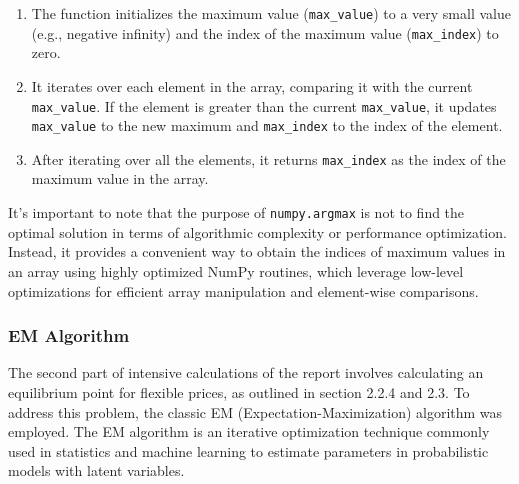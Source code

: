 \documentclass[a4paper,12pt]{article}
\begin{document}
\begin{enumerate}
	\item The function initializes the maximum value (\texttt{max\_value}) to a very small value (e.g., negative infinity) and the index of the maximum value (\texttt{max\_index}) to zero.
	\item It iterates over each element in the array, comparing it with the current \texttt{max\_value}. If the element is greater than the current \texttt{max\_value}, it updates \texttt{max\_value} to the new maximum and \texttt{max\_index} to the index of the element.
	\item After iterating over all the elements, it returns \texttt{max\_index} as the index of the maximum value in the array.
\end{enumerate}

It's important to note that the purpose of \texttt{numpy.argmax} is not to find the optimal solution in terms of algorithmic complexity or performance optimization.
Instead, it provides a convenient way to obtain the indices of maximum values in an array using highly optimized NumPy routines, which leverage low-level optimizations for efficient array manipulation and element-wise comparisons.\\

\subsubsection{EM Algorithm}

The second part of intensive calculations of the report involves calculating an equilibrium point for flexible prices, as outlined in section 2.2.4 and 2.3.
To address this problem, the classic EM (Expectation-Maximization) algorithm was employed.
The EM algorithm is an iterative optimization technique commonly used in statistics and machine learning to estimate parameters in probabilistic models with latent variables.\\

\end{document}
